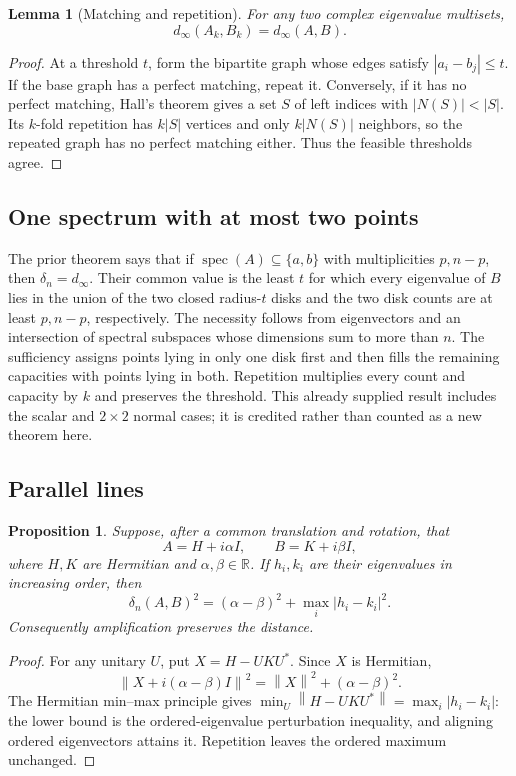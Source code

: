 \documentclass[11pt]{article}
\newtheorem{proposition}[theorem]{Proposition}
\newtheorem{lemma}[theorem]{Lemma}
\theoremstyle{definition}\newtheorem{definition}[theorem]{Definition}
\theoremstyle{remark}\newtheorem{remark}[theorem]{Remark}
\newcommand{\spec}{\operatorname{spec}}
\newcommand{\norm}[1]{\left\lVert#1\right\rVert}
\newcommand{\dd}{\delta}
\newcommand{\dm}{d_\infty}
\begin{document}
\begin{lemma}[Matching and repetition]\label{lem:matching}
For any two complex eigenvalue multisets,
\[
 \dm(A_k,B_k)=\dm(A,B).
\]
\end{lemma}
\begin{proof}
At a threshold $t$, form the bipartite graph whose edges satisfy $|a_i-b_j|\le t$. If the base graph has a perfect matching, repeat it. Conversely, if it has no perfect matching, Hall's theorem gives a set $S$ of left indices with $|N(S)|<|S|$. Its $k$-fold repetition has $k|S|$ vertices and only $k|N(S)|$ neighbors, so the repeated graph has no perfect matching either. Thus the feasible thresholds agree.
\end{proof}

\subsection{One spectrum with at most two points}
The prior theorem \cite{holden} says that if $\spec(A)\subseteq\{a,b\}$ with multiplicities $p,n-p$, then $\dd_n=\dm$. Their common value is the least $t$ for which every eigenvalue of $B$ lies in the union of the two closed radius-$t$ disks and the two disk counts are at least $p,n-p$, respectively. The necessity follows from eigenvectors and an intersection of spectral subspaces whose dimensions sum to more than $n$. The sufficiency assigns points lying in only one disk first and then fills the remaining capacities with points lying in both. Repetition multiplies every count and capacity by $k$ and preserves the threshold. This already supplied result includes the scalar and $2\times2$ normal cases; it is credited rather than counted as a new theorem here.

\subsection{Parallel lines}
\begin{proposition}\label{prop:parallel}
Suppose, after a common translation and rotation, that
\[
 A=H+i\alpha I,\qquad B=K+i\beta I,
\]
where $H,K$ are Hermitian and $\alpha,\beta\in\mathbb R$. If $h_i,k_i$ are their eigenvalues in increasing order, then
\[
 \dd_n(A,B)^2=(\alpha-\beta)^2+\max_i|h_i-k_i|^2.
\]
Consequently amplification preserves the distance.
\end{proposition}
\begin{proof}
For any unitary $U$, put $X=H-UKU^*$. Since $X$ is Hermitian,
\[
 \norm{X+i(\alpha-\beta)I}^2=\norm{X}^2+(\alpha-\beta)^2.
\]
The Hermitian min--max principle gives $\min_U\norm{H-UKU^*}=\max_i|h_i-k_i|$: the lower bound is the ordered-eigenvalue perturbation inequality, and aligning ordered eigenvectors attains it. Repetition leaves the ordered maximum unchanged.
\end{proof}
\end{document}
